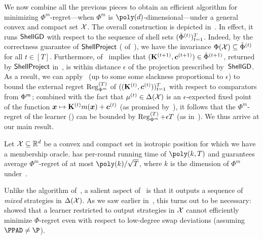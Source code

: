 We now combine all the previous pieces to obtain an efficient algorithm for minimizing $\Phi^m$-regret---when $\Phi^m$ is $\poly(d)$-dimensional---under a general convex and compact set ${\mathcal{X}}$. The overall construction is depicted in~. In effect, it runs $\textsf{ShellGD}$ with respect to the sequence of shell sets $(\tilde{\Phi}^{(t)} )_{t=1}^T$. Indeed, by the correctness guarantee of $\textsf{ShellProject}$ ( of~), we have the invariance $\Phi({\mathcal{X}}) \subseteq \tilde{\Phi}^{(t)}$ for all $t \in [T]$. Furthermore,  of~ implies that $({\mathbf{K}}^{(t+1)}, \bm{c}^{(t+1)}) \in \tilde{\Phi}^{(t+1)}$, returned by $\textsf{ShellProject}$ in~, is within distance $\epsilon$ of the projection prescribed by~$\textsf{ShellGD}$. As a result, we can apply~ (up to some some slackness proportional to $\epsilon$) to bound the external regret $\operatorname{Reg}^{(T)}_{\Phi^m}$ of $(({\mathbf{K}}^{(t)}, \bm{c}^{(t)}))_{t=1}^T$ with respect to comparators from $\Phi^m$; combined with the fact that $\mu^{(t)} \in \Delta({\mathcal{X}})$ is an $\epsilon$-expected fixed point of the function ${\bm{x}} \mapsto {\mathbf{K}}^{(t)} m({\bm{x}}) + \bm{c}^{(t)}$ (as promised by~), it follows that the $\Phi^m$-regret of the learner () can be bounded by $\operatorname{Reg}^{(T)}_{\Phi^m} + \epsilon T$ (as in~). We thus arrive at our main result.

\begin{theorem}
    \label{theorem:main-prec}
    Let ${\mathcal{X}} \subseteq \mathbb R^d$ be a convex and compact set in isotropic position for which we have a membership oracle.  has per-round running time of $\poly(k, T)$ and guarantees average $\Phi^m$-regret of at most $\poly(k) / \sqrt{T}$, where $k$ is the dimension of $\Phi^m$ under~.
\end{theorem}

Unlike the algorithm of~\citet{Daskalakis24:Efficient}, a salient aspect of~ is that it outputs a sequence of \emph{mixed} strategies in $\Delta({\mathcal{X}})$. As we saw earlier in~, this turns out to be necessary: \citet{Zhang24:Efficient} showed that a learner restricted to output strategies in ${\mathcal{X}}$ cannot efficiently minimize $\Phi$-regret even with respect to low-degree swap deviations (assuming $\PPAD \neq \P$).


